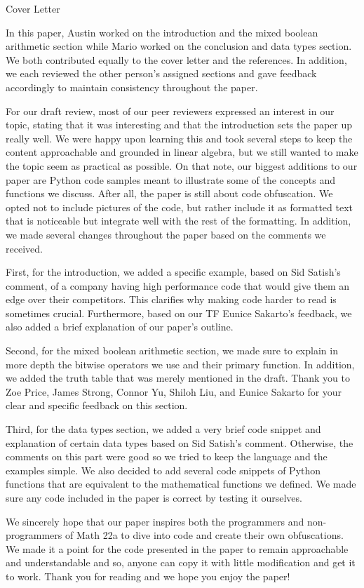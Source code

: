 \begin{center}
    {\huge Cover Letter}
\end{center}
\hspace{\parindent} In this paper, Austin worked on the introduction and the
mixed boolean arithmetic section while Mario worked on the conclusion and data
types section. We both contributed equally to the cover letter and the
references. In addition, we each reviewed the other person's assigned sections
and gave feedback accordingly to maintain consistency throughout the paper.


For our draft review, most of our peer reviewers expressed
an
interest in our
topic, stating that it was interesting and that the introduction sets the paper
up really well. We were happy upon learning this and took several steps to keep
the content approachable and grounded in linear algebra, but we still wanted to
make the topic seem as practical as possible. On that note, our biggest
additions to our paper are Python code samples meant to illustrate some of the
concepts and functions we discuss. After all, the paper is still about code
obfuscation. We opted not to include pictures of the code, but rather include
it as formatted text that is noticeable but integrate well with the rest of the
formatting. In addition, we made several changes throughout the paper based on
the comments we received.

First, for the introduction, we added a specific example, based on Sid Satish's
comment, of a company having high performance code that would give them an edge
over their competitors. This clarifies why making code harder to read is
sometimes crucial. Furthermore, based on our TF Eunice Sakarto's feedback, we
also added a brief explanation of our paper's outline.

Second, for the mixed boolean arithmetic section, we made sure to explain in
more depth the bitwise operators we use and their primary function. In
addition, we added the truth table that was merely mentioned in the draft.
Thank you to Zoe Price, James Strong, Connor Yu, Shiloh Liu, and Eunice Sakarto
for your clear and specific feedback on this section.

Third, for the data types section, we added a very brief code snippet and
explanation of certain data types based on Sid Satish's comment. Otherwise,
the comments on this part were good so we tried to keep the language and the
examples simple. We also decided to add several code snippets of Python
functions that are equivalent to the mathematical functions we defined. We made
sure any code included in the paper is correct by testing it ourselves.

We sincerely hope that our paper inspires both the programmers and
non-programmers of Math 22a to dive into code and create their own
obfuscations. We made it a point for the code presented in the paper to remain
approachable and understandable and so, anyone can copy it with little
modification and get it to work. Thank you for reading and we hope you
enjoy the paper!
\newpage
